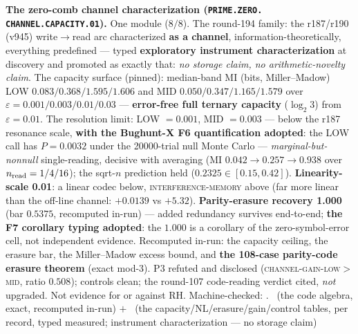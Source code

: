 \par\smallskip\noindent\textbf{The zero-comb channel
characterization (\texttt{PRIME.\allowbreak ZERO.\allowbreak
CHANNEL.\allowbreak CAPACITY.01}).}
One module ($8/8$).  The round-194 family: the r187/r190 (v945)
write$\to$read arc characterized \textbf{as a channel},
information-theoretically, everything predefined --- typed
\textbf{exploratory instrument characterization} at discovery and
promoted as exactly that: \emph{no storage claim, no
arithmetic-novelty claim}.  The capacity surface (pinned):
median-band MI (bits, Miller--Madow) LOW
$0.083/0.368/1.595/1.606$ and MID $0.050/0.347/1.165/1.579$ over
$\varepsilon = 0.001/0.003/0.01/0.03$ --- \textbf{error-free full
ternary capacity} ($\log_2 3$) from $\varepsilon = 0.01$.  The
resolution limit: LOW $= 0.001$, MID $= 0.003$ --- below the r187
resonance scale, \textbf{with the Bughunt-X F6 quantification
adopted}: the LOW call has $P = 0.0032$ under the 20000-trial
null Monte Carlo --- \emph{marginal-but-nonnull} single-reading,
decisive with averaging (MI $0.042 \to 0.257 \to 0.938$ over
$n_{\rm read} = 1/4/16$); the sqrt-$n$ prediction held ($0.2325
\in [0.15, 0.42]$).  \textbf{Linearity-scale 0.01}: a linear
codec below, \textsc{interference-memory} above (far more linear
than the off-line channel: $+0.0139$ vs $+5.32$).
\textbf{Parity-erasure recovery 1.000} (bar $0.5375$, recomputed
in-run) --- added redundancy survives end-to-end; \textbf{the F7
corollary typing adopted}: the $1.000$ is a corollary of the
zero-symbol-error cell, not independent evidence.  Recomputed
in-run: the capacity ceiling, the erasure bar, the Miller--Madow
excess bound, and \textbf{the 108-case parity-code erasure
theorem} (exact mod-3).  P3 refuted and disclosed
(\textsc{channel-gain-low$>$mid}, ratio $0.508$); controls clean;
the round-107 code-reading verdict cited, \emph{not} upgraded.
Not evidence for or against RH.
Machine-checked: .
\mE\ (the code algebra, exact, recomputed in-run) $+$ \mC\ (the
capacity/NL/erasure/gain/control tables, per record, typed
measured; instrument characterization --- no storage claim)
\par\smallskip



